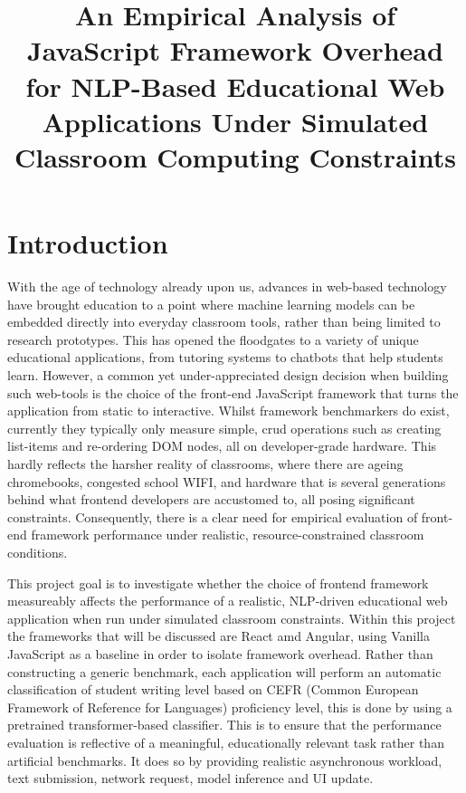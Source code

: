 \documentclass[conference]{IEEEtran}
\begin{document}
\title{An Empirical Analysis of JavaScript Framework Overhead for NLP-Based Educational Web Applications Under Simulated Classroom Computing Constraints} 

\author{
}

\maketitle

\section{Introduction}

With the age of technology already upon us, advances in web-based technology have brought education to a point where machine learning models can be embedded directly into everyday classroom tools, rather than being limited to research prototypes. This has opened the floodgates to a variety of unique educational applications, from tutoring systems to chatbots that help students learn. However, a common yet under-appreciated design decision when building such web-tools is the choice of the front-end JavaScript framework that turns the application from static to interactive. Whilst framework benchmarkers do exist, currently they typically only measure simple, crud operations such as creating list-items and re-ordering DOM nodes, all on developer-grade hardware. This hardly reflects the harsher reality of classrooms, where there are ageing chromebooks, congested school WIFI, and hardware that is several generations behind what frontend developers are accustomed to, all posing significant constraints. Consequently, there is a clear need for empirical evaluation of front-end framework performance under realistic, resource-constrained classroom conditions.

\medskip

This project goal is to investigate whether the choice of frontend framework measureably affects the performance of a realistic, NLP-driven educational web application when run under simulated classroom constraints. Within this project the frameworks that will be discussed are React amd Angular, using Vanilla JavaScript as a baseline in order to isolate framework overhead. Rather than constructing a generic benchmark, each application will perform an automatic classification of student writing level based on CEFR (Common European Framework of Reference for Languages) proficiency level, this is done by using a pretrained transformer-based classifier. This is to ensure that the performance evaluation is reflective of a meaningful, educationally relevant task rather than artificial benchmarks. It does so by providing realistic asynchronous workload, text submission, network request, model inference and UI update. 
\end{document}
